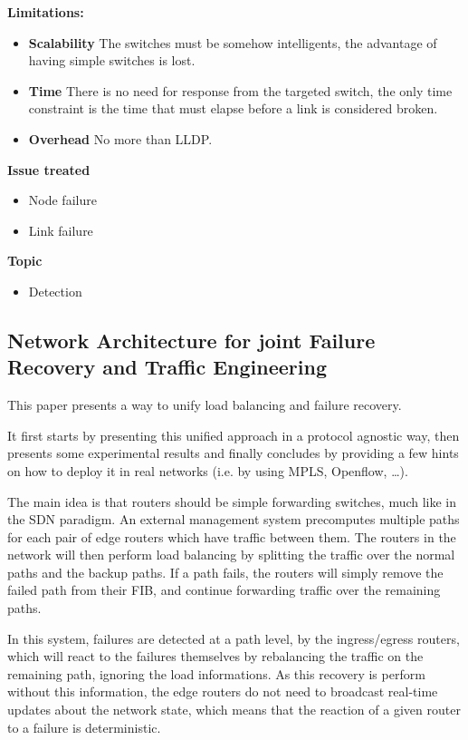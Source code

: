 \documentclass[compsoc]{IEEEtran}
\begin{document}
\textbf{Limitations:}
\begin{itemize}
	\item \textbf{Scalability} The switches must be somehow intelligents, the advantage of having simple switches is lost.
	\item \textbf{Time} There is no need for response from the targeted switch, the only time constraint is the time that must elapse before a link is considered broken.
	\item \textbf{Overhead} No more than LLDP.
\end{itemize}

\textbf{Issue treated}
\begin{itemize}
	\item Node failure
	\item Link failure
\end{itemize}

\textbf{Topic}
\begin{itemize}
	\item Detection
\end{itemize}

\subsection{Network Architecture for joint Failure Recovery and Traffic Engineering \cite{Suchara:2011:NAJ:1993744.1993756}}
This paper presents a way to unify load balancing and failure recovery.

It first starts by presenting this unified approach in a protocol agnostic way, then presents some experimental results and finally concludes by providing a few hints on how to deploy it in real networks (i.e. by using MPLS, Openflow, \ldots).

The main idea is that routers should be simple forwarding switches, much like in the SDN paradigm. An external management system precomputes multiple paths for each pair of edge routers which have traffic between them. The routers in the network will then perform load balancing by splitting the traffic over the normal paths and the backup paths. If a path fails, the routers will simply remove the failed path from their FIB, and continue forwarding traffic over the remaining paths.

In this system, failures are detected at a path level, by the ingress/egress routers, which will react to the failures themselves by rebalancing the traffic on the remaining path, ignoring the load informations. As this recovery is perform without this information, the edge routers do not need to broadcast real-time updates about the network state, which means that the reaction of a given router to a failure is deterministic. 
\end{document}
